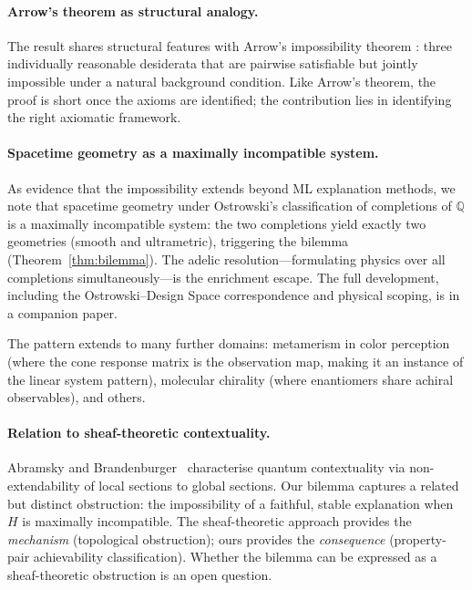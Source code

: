 \documentclass[11pt,a4paper]{article}
\begin{document}
\paragraph{Arrow's theorem as structural analogy.}
The result shares structural features with Arrow's impossibility
theorem \citep{arrow1951social}: three individually reasonable desiderata
that are pairwise satisfiable but jointly impossible under a natural
background condition.  Like Arrow's theorem, the proof is short once the
axioms are identified; the contribution lies in identifying the right
axiomatic framework.

\paragraph{Spacetime geometry as a maximally incompatible system.}
As evidence that the impossibility extends beyond ML explanation methods,
we note that spacetime geometry under Ostrowski's classification of
completions of $\mathbb{Q}$ is a maximally incompatible system: the two
completions yield exactly two geometries (smooth and ultrametric),
triggering the bilemma (Theorem~\ref{thm:bilemma}).  The adelic
resolution---formulating physics over all completions
simultaneously---is the enrichment escape.  The full development,
including the Ostrowski--Design Space correspondence and physical
scoping, is in a companion paper.

The pattern extends to many further domains: metamerism in color perception (where the cone response matrix is the observation map, making it an instance of the linear system pattern), molecular chirality (where enantiomers share achiral observables), and others.

\paragraph{Relation to sheaf-theoretic contextuality.}
Abramsky and Brandenburger~\citep{abramsky2011sheaf} characterise quantum contextuality via non-extendability of local sections to global sections. Our bilemma captures a related but distinct obstruction: the impossibility of a faithful, stable explanation when $H$ is maximally incompatible. The sheaf-theoretic approach provides the \emph{mechanism} (topological obstruction); ours provides the \emph{consequence} (property-pair achievability classification). Whether the bilemma can be expressed as a sheaf-theoretic obstruction is an open question.
\end{document}
